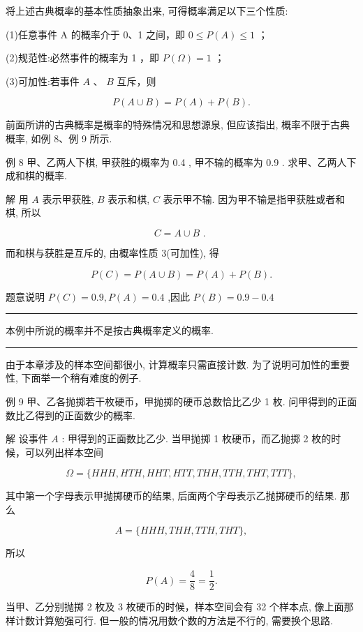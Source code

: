 \documentclass[10pt]{article}
\newcommand{\HRule}{\begin{center}\rule{0.9\linewidth}{0.2mm}\end{center}}
\begin{document}
将上述古典概率的基本性质抽象出来, 可得概率满足以下三个性质:

(1)任意事件 A 的概率介于 0、1 之间，即 \(0 \leq  P\left( A\right)  \leq  1\) ；

(2)规范性:必然事件的概率为 1 ，即 \(P\left( \Omega \right)  = 1\) ；

(3)可加性:若事件 \(A\) 、 \(B\) 互斥，则

\[
P\left( {A \cup  B}\right)  = P\left( A\right)  + P\left( B\right) .
\]

前面所讲的古典概率是概率的特殊情况和思想源泉, 但应该指出, 概率不限于古典概率, 如例 8、例 9 所示.

例 8 甲、乙两人下棋, 甲获胜的概率为 0.4 , 甲不输的概率为 0.9 . 求甲、乙两人下成和棋的概率.

解 用 \(A\) 表示甲获胜, \(B\) 表示和棋, \(C\) 表示甲不输. 因为甲不输是指甲获胜或者和棋, 所以

\[
C = A \cup  B\text{ . }
\]

而和棋与获胜是互斥的, 由概率性质 3(可加性), 得

\[
P\left( C\right)  = P\left( {A \cup  B}\right)  = P\left( A\right)  + P\left( B\right) .
\]

题意说明 \(P\left( C\right)  = {0.9},P\left( A\right)  = {0.4}\) ,因此 \(P\left( B\right)  = {0.9} - {0.4}\)

\HRule

本例中所说的概率并不是按古典概率定义的概率.

\HRule



由于本章涉及的样本空间都很小, 计算概率只需直接计数. 为了说明可加性的重要性, 下面举一个稍有难度的例子.

例 9 甲、乙各抛掷若干枚硬币，甲抛掷的硬币总数恰比乙少 1 枚. 问甲得到的正面数比乙得到的正面数少的概率.

解 设事件 \(A\) : 甲得到的正面数比乙少. 当甲抛掷 1 枚硬币，而乙抛掷 2 枚的时候，可以列出样本空间

\[
\Omega  = \{ {HHH},{HTH},{HHT},{HTT},{THH},{TTH},{THT},{TTT}\} ,
\]

其中第一个字母表示甲抛掷硬币的结果, 后面两个字母表示乙抛掷硬币的结果. 那么

\[
A = \{ {HHH},{THH},{TTH},{THT}\} ,
\]

所以

\[
P\left( A\right)  = \frac{4}{8} = \frac{1}{2}.
\]

当甲、乙分别抛掷 2 枚及 3 枚硬币的时候，样本空间会有 32 个样本点, 像上面那样计数计算勉强可行. 但一般的情况用数个数的方法是不行的, 需要换个思路.
\end{document}
